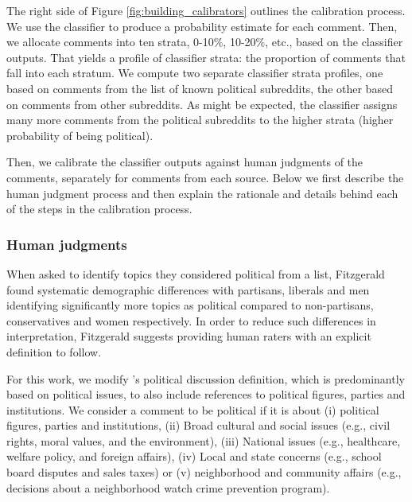 \documentclass[letterpaper]{article} %
\begin{document}
The right side of Figure \ref{fig:building_calibrators} outlines the calibration process. We use the classifier to produce a probability estimate for each comment. Then, we allocate comments into ten strata, 0-10\%, 10-20\%, etc., based on the classifier outputs. That yields a profile of classifier strata: the proportion of comments that fall into each stratum. We compute two separate classifier strata profiles, one based on comments from the list of known political subreddits, the other based on comments from other subreddits. As might be expected, the classifier assigns many more comments from the political subreddits to the higher strata (higher probability of being political).

Then, we calibrate the classifier outputs against human judgments of the comments, separately for comments from each source. Below we first describe the human judgment process and then explain the rationale and details behind each of the steps in the calibration process.

\subsubsection{Human judgments}
When asked to identify topics they considered political from a list, Fitzgerald \citeyearpar{fitzgerald2013does} found systematic demographic differences with partisans, liberals and men identifying significantly more topics as political compared to non-partisans, conservatives and women respectively. In order to reduce such differences in interpretation, Fitzgerald suggests providing human raters with an explicit definition to follow.

For this work, we modify \cite{moy2006predicting}'s political discussion definition, which is predominantly based on political issues, to also include references to political figures, parties and institutions. We consider a comment to be political if it is about (i) political figures, parties and institutions, (ii) Broad cultural and social issues (e.g., civil rights, moral values, and the environment), (iii) National issues (e.g., healthcare, welfare policy, and foreign affairs), (iv) Local and state concerns (e.g., school board disputes and sales taxes) or (v) neighborhood and community affairs (e.g., decisions about a neighborhood watch crime prevention program). 
\end{document}
